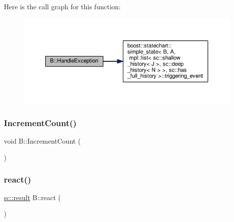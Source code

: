 Here is the call graph for this function\+:
\nopagebreak
\begin{figure}[H]
\begin{center}
\leavevmode
\includegraphics[width=350pt]{struct_b_a8eb80df2fcfde5209e4800f5aec2d7a5_cgraph}
\end{center}
\end{figure}
\mbox{\label{struct_b_a862e39288b607fcc7e71f9fa07c0cd20}} 
\subsubsection{\texorpdfstring{Increment\+Count()}{IncrementCount()}}
{\footnotesize\ttfamily void B\+::\+Increment\+Count (\begin{DoxyParamCaption}\item[{const \mbox{\hyperlink{struct_f}{F}} \&}]{ }\end{DoxyParamCaption})\hspace{0.3cm}{\ttfamily [inline]}}

\mbox{\label{struct_b_add69d6626a14cef8f58929dfbe940cb9}} 
\subsubsection{\texorpdfstring{react()}{react()}\hspace{0.1cm}{\footnotesize\ttfamily [1/3]}}
{\footnotesize\ttfamily \mbox{\hyperlink{namespaceboost_1_1statechart_abe807f6598b614d6d87bb951ecd92331}{sc\+::result}} B\+::react (\begin{DoxyParamCaption}\item[{const \mbox{\hyperlink{struct_ev_discard_never}{Ev\+Discard\+Never}} \&}]{ }\end{DoxyParamCaption})\hspace{0.3cm}{\ttfamily [inline]}}

